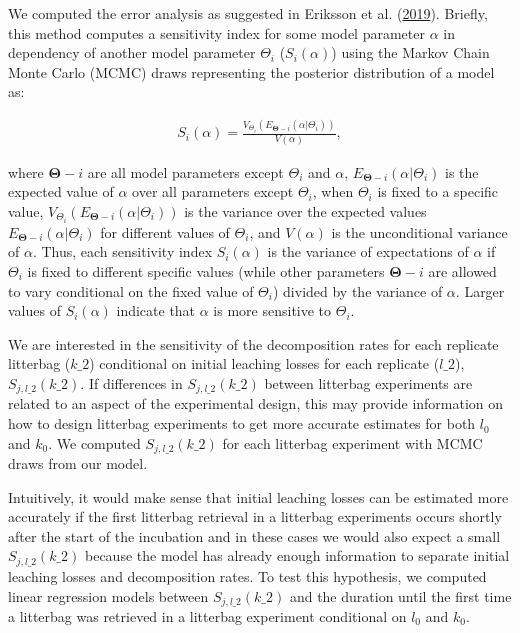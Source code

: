 \documentclass[
  12pt,
]{article}
\begin{document}
We computed the error analysis as suggested in Eriksson et al. (\protect\hyperlink{ref-Eriksson.2019}{2019}). Briefly, this method computes a sensitivity index for some model parameter \(\alpha\) in dependency of another model parameter \(\Theta_i\) (\(S_i(\alpha)\)) using the Markov Chain Monte Carlo (MCMC) draws representing the posterior distribution of a model as:

\begin{equation}
\begin{aligned}
S_i(\alpha) = \frac{V_{\Theta_i}(E_{\bm{{\Theta}}-i}(\alpha|\Theta_i))}{V(\alpha)},
\label{eq:eriksson2019-1}
\end{aligned}
\end{equation}

where \(\bm{{\Theta}}-i\) are all model parameters except \(\Theta_i\) and \(\alpha\), \(E_{\bm{{\Theta}}-i}(\alpha|\Theta_i)\) is the expected value of \(\alpha\) over all parameters except \(\Theta_i\), when \(\Theta_i\) is fixed to a specific value, \(V_{\Theta_i}(E_{\bm{{\Theta}}-i}(\alpha|\Theta_i))\) is the variance over the expected values \(E_{\bm{{\Theta}}-i}(\alpha|\Theta_i)\) for different values of \(\Theta_i\), and \(V(\alpha)\) is the unconditional variance of \(\alpha\). Thus, each sensitivity index \(S_i(\alpha)\) is the variance of expectations of \(\alpha\) if \(\Theta_i\) is fixed to different specific values (while other parameters \(\bm{{\Theta}}-i\) are allowed to vary conditional on the fixed value of \(\Theta_i\)) divided by the variance of \(\alpha\). Larger values of \(S_i(\alpha)\) indicate that \(\alpha\) is more sensitive to \(\Theta_i\).

We are interested in the sensitivity of the decomposition rates for each replicate litterbag (\(k\_2\)) conditional on initial leaching losses for each replicate (\(l\_2\)), \(S_{j, l\_2}(k\_2)\). If differences in \(S_{j, l\_2}(k\_2)\) between litterbag experiments are related to an aspect of the experimental design, this may provide information on how to design litterbag experiments to get more accurate estimates for both \(l_0\) and \(k_0\). We computed \(S_{j, l\_2}(k\_2)\) for each litterbag experiment with MCMC draws from our model.

Intuitively, it would make sense that initial leaching losses can be estimated more accurately if the first litterbag retrieval in a litterbag experiments occurs shortly after the start of the incubation and in these cases we would also expect a small \(S_{j, l\_2}(k\_2)\) because the model has already enough information to separate initial leaching losses and decomposition rates. To test this hypothesis, we computed linear regression models between \(S_{j, l\_2}(k\_2)\) and the duration until the first time a litterbag was retrieved in a litterbag experiment conditional on \(l_0\) and \(k_0\).
\end{document}
